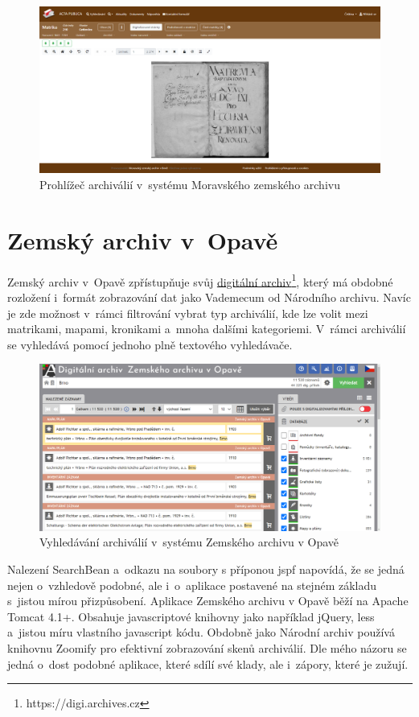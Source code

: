 \begin{figure}[htbp]
\centering
    \includegraphics[scale=.2]{obrazky-figures/archives/mza/prohlizec.png}
    \caption{Prohlížeč archiválií v~systému Moravského zemského archivu}
\end{figure}
\newpage
\section{Zemský archiv v~Opavě}
Zemský archiv v~Opavě zpřístupňuje svůj \href{https://digi.archives.cz}{digitální archiv}\footnote{https://digi.archives.cz}, který má obdobné rozložení i~formát zobrazování dat jako Vademecum od Národního archivu. Navíc je zde možnost v~rámci filtrování vybrat typ archiválií, kde lze volit mezi matrikami, mapami, kronikami a~mnoha dalšími kategoriemi. V~rámci archiválií se vyhledává pomocí jednoho plně textového vyhledávače.

\begin{figure}[htbp]
\centering
    \includegraphics[scale=.2]{obrazky-figures/archives/zaOpava/vyhledani.png}
    \caption{Vyhledávání archiválií v~systému Zemského archivu v Opavě}
\end{figure}

\noindent
Nalezení SearchBean a~odkazu na soubory s příponou jspf napovídá, že se jedná nejen o~vzhledově podobné, ale i~o~aplikace postavené na stejném základu s~jistou mírou přizpůsobení. Aplikace Zemského archivu v Opavě běží na Apache Tomcat 4.1+. Obsahuje javascriptové knihovny jako například jQuery, less a~jistou míru vlastního javascript kódu. Obdobně jako Národní archiv používá knihovnu Zoomify pro efektivní zobrazování skenů archiválií. Dle mého názoru se jedná o~dost podobné aplikace, které sdílí své klady, ale i~zápory, které je zužují.

